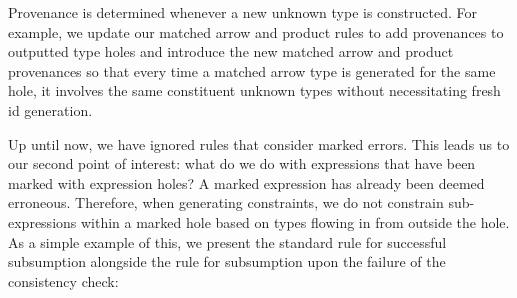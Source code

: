 Provenance is determined whenever a new unknown type is constructed. For example, we update our matched arrow and product rules to add provenances to outputted type holes and introduce the new matched arrow and product provenances so that every time a matched arrow type is generated for the same hole, it involves the same constituent unknown types without necessitating fresh id generation.
\begin{mathpar}

\end{mathpar}

Up until now, we have ignored rules that consider marked errors. This leads us to our second point of interest: what do we do with expressions that have been marked with expression holes? A marked expression has already been deemed erroneous. Therefore, when generating constraints, we do not constrain sub-expressions within a marked hole based on types flowing in from outside the hole. As a simple example of this, we present the standard rule for successful subsumption alongside the rule for subsumption upon the failure of the consistency check:

\begin{mathpar}
  
\end{mathpar}

